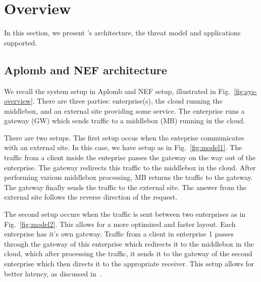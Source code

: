 
\section{Overview}\label{sec:overview}

In this section, we present \sys's architecture, the threat model and applications supported.

\subsection{Aplomb and NEF architecture}

We recall the system setup in Aplomb and NEF setup, illustrated in Fig.~\ref{fig:sys-overview}. 
There are three parties: enterprise(s), the cloud running the middlebox, and an external site providing
some service. 
The enterprise runs a gateway (GW) which sends traffic to a middlebox (MB) running in the cloud.

There are two setups. The first setup occus when the enteprise communicates with an external site.  In this case, we have setup as in Fig.~\ref{fig:model1}.
The traffic from a client inside the enteprise passes the gateway on the way out of the enterprise. The gateway redirects this traffic to the middlebox in the cloud.
After performing various middlebox processing, MB returns the traffic to the gateway. The gateway finally sends the traffic to the external site. 
The answer from the external site follows the reverse direction of the
request.


The second setup occurs when the traffic is sent between two enterprises as in Fig.~\ref{fig:model2}. This allows for a more optimized and faster layout. Each enterprise has it's own gateway.
Traffic from a client in enterprise 1 passes through the gateway of this enterprise which redirects it to the middlebox in the cloud, which after processing the traffic, it sends it to the gateway of the second enterprise which then directs it to the appropriate receiver. This setup allows for better latency, as discussed in~\cite{aplomb}.





